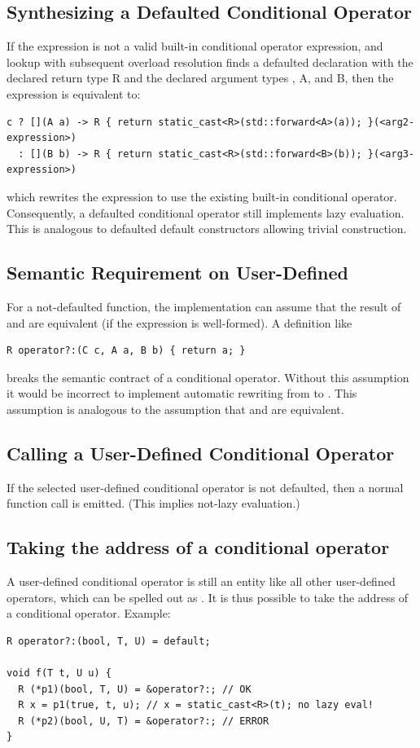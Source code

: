 \subsection{Synthesizing a Defaulted Conditional Operator}\label{sec:synthesizing}
If the expression  is not a
valid built-in conditional operator expression, and lookup with subsequent
overload resolution finds a defaulted  declaration with the
declared return type \type R and the declared argument types , \type
A, and \type B, then the expression is equivalent to:
\medskip\begin{lstlisting}
c ? [](A a) -> R { return static_cast<R>(std::forward<A>(a)); }(<arg2-expression>)
  : [](B b) -> R { return static_cast<R>(std::forward<B>(b)); }(<arg3-expression>)
\end{lstlisting}
which rewrites the expression to use the existing built-in conditional
operator.
Consequently, a defaulted conditional operator still implements lazy
evaluation.
This is analogous to defaulted default constructors allowing trivial
construction.

\subsection{Semantic Requirement on User-Defined }
For a not-defaulted  function, the implementation can
assume that the result of  and  are
equivalent (if the expression  is well-formed).
A definition like
\medskip\begin{lstlisting}
R operator?:(C c, A a, B b) { return a; }
\end{lstlisting}
breaks the semantic contract of a conditional operator.
Without this assumption it would be incorrect to implement automatic rewriting
from  to .
This assumption is analogous to the assumption that  and  are equivalent.

\subsection{Calling a User-Defined Conditional Operator}
If the selected user-defined conditional operator is not defaulted, then a
normal function call is emitted.
(This implies not-lazy evaluation.)

\subsection{Taking the address of a conditional operator}
A user-defined conditional operator is still an entity like all other
user-defined operators, which can be spelled out as .
It is thus possible to take the address of a conditional operator.
Example:
\medskip\begin{lstlisting}
R operator?:(bool, T, U) = default;

void f(T t, U u) {
  R (*p1)(bool, T, U) = &operator?:; // OK
  R x = p1(true, t, u); // x = static_cast<R>(t); no lazy eval!
  R (*p2)(bool, U, T) = &operator?:; // ERROR
}
\end{lstlisting}


